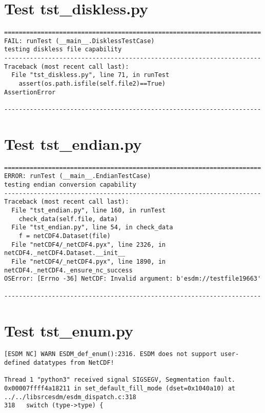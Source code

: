 \section{Test tst\_diskless.py}

\begin{verbatim}
======================================================================
FAIL: runTest (__main__.DisklessTestCase)
testing diskless file capability
----------------------------------------------------------------------
Traceback (most recent call last):
  File "tst_diskless.py", line 71, in runTest
    assert(os.path.isfile(self.file2)==True)
AssertionError

----------------------------------------------------------------------
\end{verbatim}

\section{Test tst\_endian.py}

\begin{verbatim}
======================================================================
ERROR: runTest (__main__.EndianTestCase)
testing endian conversion capability
----------------------------------------------------------------------
Traceback (most recent call last):
  File "tst_endian.py", line 160, in runTest
    check_data(self.file, data)
  File "tst_endian.py", line 54, in check_data
    f = netCDF4.Dataset(file)
  File "netCDF4/_netCDF4.pyx", line 2326, in netCDF4._netCDF4.Dataset.__init__
  File "netCDF4/_netCDF4.pyx", line 1890, in netCDF4._netCDF4._ensure_nc_success
OSError: [Errno -36] NetCDF: Invalid argument: b'esdm://testfile19663'

----------------------------------------------------------------------
\end{verbatim}

\section{Test tst\_enum.py}

\begin{verbatim}
[ESDM NC] WARN ESDM_def_enum():2316. ESDM does not support user-defined datatypes from NetCDF!

Thread 1 "python3" received signal SIGSEGV, Segmentation fault.
0x00007ffff4a18211 in set_default_fill_mode (dset=0x1040a10) at ../../libsrcesdm/esdm_dispatch.c:318
318	  switch (type->type) {
\end{verbatim}

